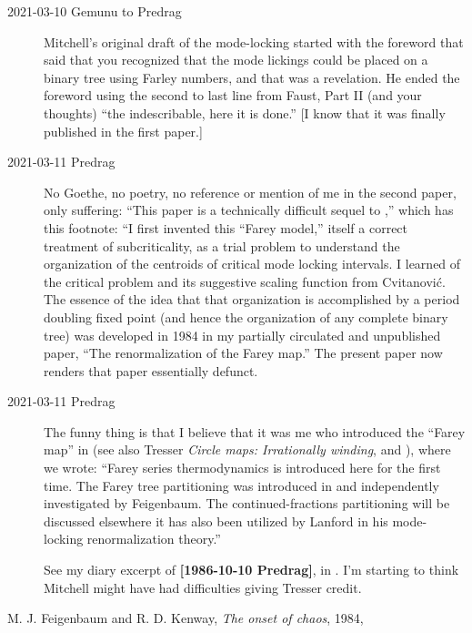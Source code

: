 \begin{description}
  \item[2021-03-10 Gemunu to Predrag]
Mitchell's original draft of the mode-locking started with the foreword
that said that you recognized that the mode lickings could be placed on a
binary tree using Farley numbers, and that was a revelation. He ended the
foreword using the second to last line from Faust, Part II (and your
thoughts) ``the indescribable, here it is done.'' [I know that it was
finally published in the first paper.]
  \item[2021-03-11 Predrag]
No Goethe, no poetry, no reference or mention of me in the second
paper, only suffering: ``This paper is a technically
difficult sequel to ,'' which has this footnote: ``I
first invented this ``Farey model,'' itself a correct treatment of
subcriticality, as a trial problem to understand the organization of the
centroids of critical mode locking intervals. I learned of the critical
problem and its suggestive scaling function from Cvitanovi\'c. The essence
of the idea that that organization is accomplished by a period doubling
fixed point (and hence the organization of any complete binary tree) was
developed in 1984 in my partially circulated and unpublished paper, ``The
renormalization of the Farey map.'' The present paper now renders that
paper essentially defunct.
  \item[2021-03-11 Predrag]
The funny thing is that I believe that it was me who introduced
the ``Farey map'' in  (see also
Tresser {\em Circle maps: {Irrationally} winding}, and
), where we wrote:
``Farey series thermodynamics is introduced here for the first time. The
Farey tree partitioning was introduced in  and
independently investigated by Feigenbaum. The
continued-fractions partitioning will be discussed elsewhere it
has also been utilized by Lanford in his mode-locking renormalization
theory.''

See my diary excerpt of {\bf [1986-10-10 Predrag]}, in .
I'm starting to think Mitchell might have had difficulties giving Tresser
credit.
\end{description}

{M. J. Feigenbaum and R. D. Kenway},
{\em The onset of chaos},
{1984},

